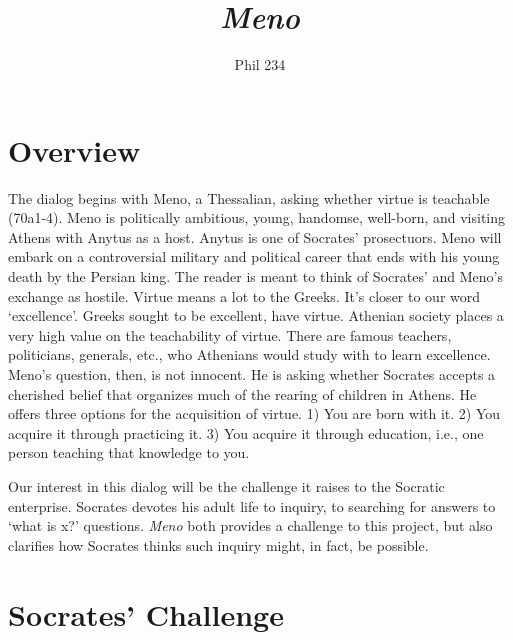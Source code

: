 \documentclass[10 pt]{article}
\begin{document}
\author{Phil 234}
\title{\emph{Meno}}
\maketitle

\section*{Overview}
The dialog begins with Meno, a Thessalian, asking whether virtue is teachable (70a1-4). Meno is politically ambitious, young, handomse, well-born, and visiting Athens with Anytus as a host. Anytus is one of Socrates' prosectuors. Meno will embark on a controversial military and political career that ends with his young death by the Persian king. The reader is meant to think of Socrates' and Meno's exchange as hostile. Virtue means a lot to the Greeks. It's closer to our word `excellence'. Greeks sought to be excellent, have virtue. Athenian society places a very high value on the teachability of virtue.  There are famous teachers, politicians, generals, etc., who Athenians would study with to learn excellence. Meno's question, then, is not innocent. He is asking whether Socrates accepts a cherished belief that organizes much of the rearing of children in Athens. He offers three options for the acquisition of virtue. 1) You are born with it. 2) You acquire it through practicing it. 3) You acquire it through education, i.e., one person teaching that knowledge to you. 

Our interest in this dialog will be the challenge it raises to the Socratic enterprise. Socrates devotes his adult life to inquiry, to searching for answers to `what is x?' questions. \emph{Meno} both provides a challenge to this project, but also clarifies how Socrates thinks such inquiry might, in fact, be possible. 


\section*{Socrates' Challenge}
\end{document}
